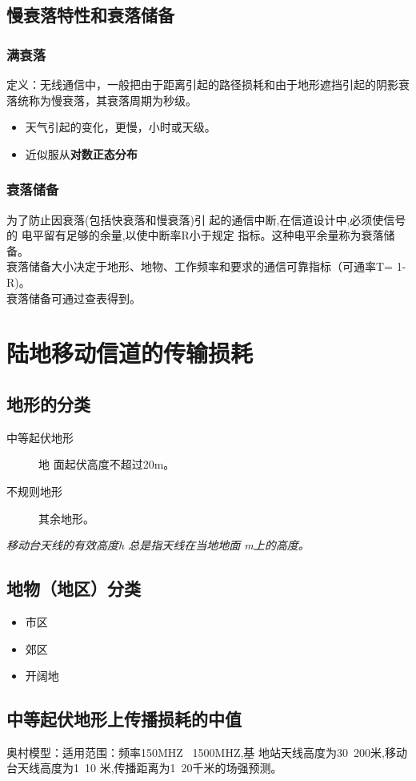 \subsection{ 慢衰落特性和衰落储备
}
\subsubsection{满衰落}
定义：无线通信中，一般把由于距离引起的路径损耗和由于地形遮挡引起的阴影衰落统称为慢衰落，其衰落周期为秒级。
\begin{itemize}
	\item 天气引起的变化，更慢，小时或天级。
	\item 近似服从\textbf{对数正态分布}
\end{itemize}
\subsubsection{衰落储备}
 为了防止因衰落(包括快衰落和慢衰落)引
起的通信中断,在信道设计中,必须使信号的
电平留有足够的余量,以使中断率R小于规定
指标。这种电平余量称为衰落储备。\\
衰落储备大小决定于地形、地物、工作频率和要求的通信可靠指标（可通率T= 1-R)。\\
衰落储备可通过查表得到。

\section{陆地移动信道的传输损耗
}
\subsection{地形的分类
}
\begin{description}
	\item[中等起伏地形]地
	面起伏高度不超过20m。
	\item[不规则地形] 其余地形。
\end{description}
\textit{移动台天线的有效高度h 总是指天线在当地地面
	m上的高度。
}
\subsection{地物（地区）分类}
\begin{itemize}
	\item 市区
	\item 郊区
	\item 开阔地
\end{itemize}
\subsection{中等起伏地形上传播损耗的中值
}
奥村模型：适用范围：频率150MHZ ~1500MHZ,基
地站天线高度为30~200米,移动台天线高度为1~10
米,传播距离为1~20千米的场强预测。\\

